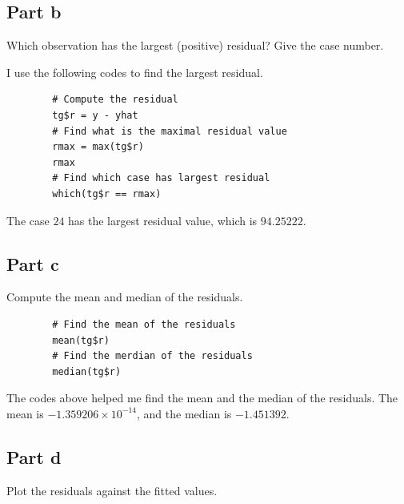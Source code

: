 \subsection{Part b}

\begin{question}
    Which observation has the largest (positive) residual? Give the case number.
\end{question}

\begin{answer}
    I use the following codes to find the largest residual.
    \begin{verbatim}
        # Compute the residual
        tg$r = y - yhat
        # Find what is the maximal residual value
        rmax = max(tg$r)
        rmax
        # Find which case has largest residual
        which(tg$r == rmax)
    \end{verbatim}
    The case $24$ has the largest residual value, which is $94.25222$.
\end{answer}

\subsection{Part c}

\begin{question}
    Compute the mean and median of the residuals.
\end{question}

\begin{answer}
    \begin{verbatim}
        # Find the mean of the residuals
        mean(tg$r)
        # Find the merdian of the residuals
        median(tg$r)
    \end{verbatim}
    The codes above helped me find the mean and the median of the residuals. The mean is $-1.359206\times 10^{-14}$, and the median is $-1.451392$.
\end{answer}

\subsection{Part d}

\begin{question}
    Plot the residuals against the fitted values.
\end{question}

